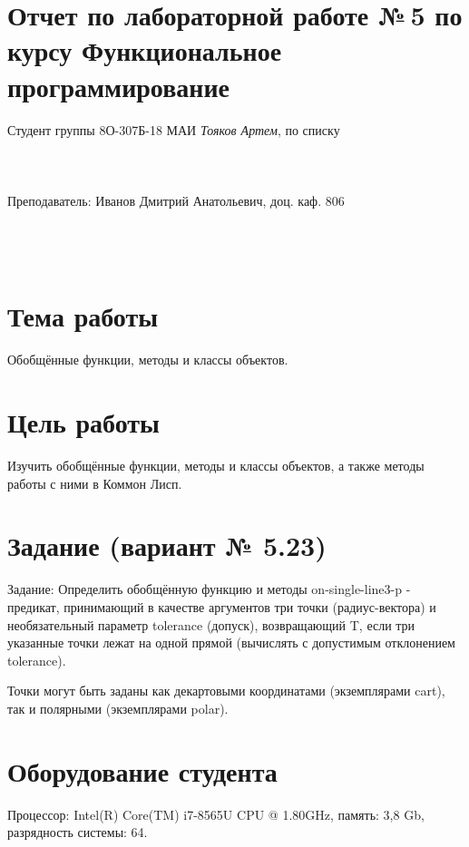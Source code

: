 \documentclass[12pt]{article}
\begin{document}
\section*{Отчет по лабораторной работе №\,5
по курсу \guillemotleft  Функциональное программирование\guillemotright}
\begin{flushright}
Студент группы 8О-307Б-18 МАИ \textit{Тояков Артем},  по списку \\
 \\
 \\
\ \\
Преподаватель: Иванов Дмитрий Анатольевич, доц. каф. 806 \\
 \\
 \\
 \\

\end{flushright}

\section{Тема работы}
Обобщённые функции, методы и классы объектов.

\section{Цель работы}
Изучить обобщённые функции, методы и классы объектов, а также методы работы с ними в Коммон Лисп.

\section{Задание (вариант № 5.23)}
Задание: Определить обобщённую функцию и методы on-single-line3-p - предикат, принимающий в качестве аргументов три точки (радиус-вектора) и необязательный параметр tolerance (допуск), возвращающий T, если три указанные точки лежат на одной прямой (вычислять с допустимым отклонением tolerance).

Точки могут быть заданы как декартовыми координатами (экземплярами cart), так и полярными (экземплярами polar).

\section{Оборудование студента}
Процессор: Intel(R) Core(TM) i7-8565U CPU @ 1.80GHz, память: 3,8 Gb, разрядность системы: 64.
\end{document}
